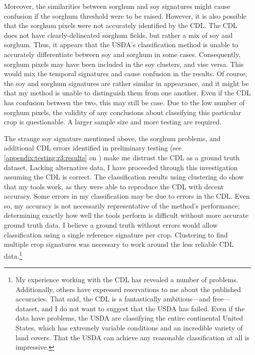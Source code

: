 Moreover, the similarities between sorghum and soy signatures might cause confusion if the sorghum threshold were to be raised. However, it is also possible that the sorghum pixels were not accurately identified by the CDL. The CDL does not have clearly-delineated sorghum fields, but rather a mix of soy and sorghum. Thus, it appears that the USDA’s classification method is unable to accurately differentiate between soy and sorghum in some cases. Consequently, sorghum pixels may have been included in the soy clusters, and vise versa. This would mix the temporal signatures and cause confusion in the results. Of course, the soy and sorghum signatures are rather similar in appearance, and it might be that my method is unable to distinguish them from one another. Even if the CDL has confusion between the two, this may still be case. Due to the low number of sorghum pixels, the validity of any conclusions about classifying this particular crop is questionable. A larger sample size and more testing are required.

The strange soy signature mentioned above, the sorghum problems, and additional CDL errors identified in preliminary testing (see \autoref{appendix:testing:r3:results} on ) make me distrust the CDL as a ground truth dataset. Lacking alternative data, I have proceeded through this investigation assuming the CDL is correct. The classification results using clustering do show that my tools work, as they were able to reproduce the CDL with decent accuracy. Some errors in my classification may be due to errors in the CDL. Even so, my accuracy is not necessarily representative of the method's performance; determining exactly how well the tools perform is difficult without more accurate ground truth data. I believe a ground truth without errors would allow classification using a single reference signature per crop. Clustering to find multiple crop signatures was necessary to work around the less reliable CDL data.\footnote{My experience working with the CDL has revealed a number of problems. Additionally, others have expressed reservations to me about the published accuracies. That said, the CDL is a fantastically ambitious---and free---dataset, and I do not want to suggest that the USDA has failed. Even if the data have problems, the USDA are classifying the entire continental United States, which has extremely variable conditions and an incredible variety of land covers. That the USDA can achieve any reasonable classification at all is impressive.} 



